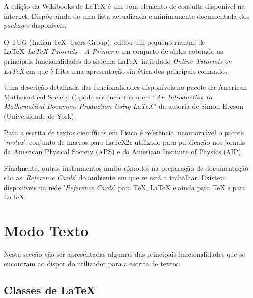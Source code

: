 \documentclass[a4paper,12pt]{article}
\begin{document}
A edição da Wikibooks de \LaTeX\cite{LaTeX:Wiki} é 
um bom elemento de consulta disponível na internet. Dispõe ainda
de uma lista actualizada e minimamente documentada 
dos {\it packages} disponíveis.

O TUG (Indian \TeX\ Users Group), editou um pequeno manual
de \LaTeX\ {\it LaTeX Tutorials - A Primer}\cite{TUG:2003} e
um conjunto de slides cobrindo as principais funcionalidades
do sistema \LaTeX\ intitulado {\it Online Tutorials on LaTeX}\cite{TUG:2000}
em que é feita uma apresentação
sintética dos principais comandos.

Uma descrição detalhada das funcionalidades disponíveis no pacote da
American Mathematical Society (\AmS) pode ser encontrada em 
''{\it An Introduction to Mathematical Document Production 
Using \AmS\LaTeX}''\cite{Eveson} da autoria de Simon Eveson
(Universidade de York).

Para a escrita de textos científicos em Física é referência incontornável
o pacote '{\it revtex}'\cite{RevTeX}: conjunto de macros para \LaTeX2$\epsilon$
utilizado para publicação nos jornais da American Physical Society (APS) 
e do American Institute of Physics (AIP).

Finalmente, outros instrumentos muito cómodos na preparação de
documentação são as '{\it Reference Cards}' do ambiente em que
se está a trabalhar. Existem disponíveis na rede '{\it Reference Cards}'
para \TeX\cite{RefCard:TeX}, \LaTeX\cite{RefCard:LaTeX} e ainda 
para \AmS\TeX\cite{RefCard:AmSTeX} e 
para \AmS\LaTeX\cite{RefCard:AmSLaTeX}.

\break 

\section{Modo Texto}

Nesta secção vão ser apresentadas algumas das principais 
funcionalidades que se encontram ao dispor do utilizador 
para a escrita de textos.

\subsection{Classes de \LaTeX}
\end{document}
